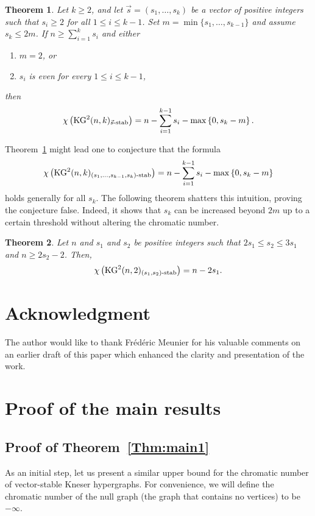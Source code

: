 \documentclass[preprint,12pt,3p]{elsarticle}
\newtheorem{theorem}{Theorem}
\begin{document}
\begin{theorem}\label{Theorem:Main2}
Let $k \geq 2$, and let $\vec{s} = (s_1, \ldots, s_k)$ be a vector of positive integers such that $s_i \geq 2$ for all $1 \leq i \leq k-1$. Set $m = \min\{s_1, \ldots, s_{k-1}\}$ and assume $s_k \leq 2m$. If $n \geq \sum_{i=1}^{k} s_i$ and either
\begin{enumerate}
    \item[(i)] $m = 2$, or
    \item[(ii)] $s_i$ is even for every $1 \leq i \leq k-1$,
\end{enumerate}
then
\[
\chi\left(\mathrm{KG}^{2}(n, k)_{\vec{s}\textup{-stab}}\right) = n - \sum_{i=1}^{k-1} s_i - \max\left\{0, s_k - m\right\}.
\]
\end{theorem}


Theorem~\ref{Theorem:Main2} might lead one to conjecture that the formula
\[
\chi\left(\mathrm{KG}^{2}(n, k)_{(s_1,\ldots, s_{k-1}, s_k)\textup{-stab}}\right) = n - \sum_{i=1}^{k-1} s_i - \max\left\{0, s_k - m\right\}
\]
holds generally for all $s_k$. The following theorem shatters this intuition, proving the conjecture false. Indeed, it shows that $s_k$ can be increased beyond $2m$ up to a certain threshold without altering the chromatic number.
\begin{theorem}\label{Theorem: Main3}
Let $n$ and $s_1$ and $s_2$ be positive integers such that  $2s_1\leq s_2\leq 3s_1$ and $n \geq 2s_2-2$. Then,
\[
\chi\left(\mathrm{KG}^{2}(n, 2)_{(s_1, s_2)\textup{-stab}}\right) = n - 2s_1.
\]
\end{theorem}


\section*{Acknowledgment} The author would like to thank Fr{\'e}d{\'e}ric Meunier for his valuable comments on an earlier draft of this paper which enhanced the clarity and presentation of the work.


\section{Proof of the main results}\label{proof}


\subsection{Proof of Theorem~\ref{Thm:main1}}
As an initial step, let us present a similar upper bound for the chromatic number of vector-stable Kneser hypergraphs. For convenience, we will define the chromatic number of the null graph (the graph that contains no vertices) to be $-\infty$.
\end{document}

